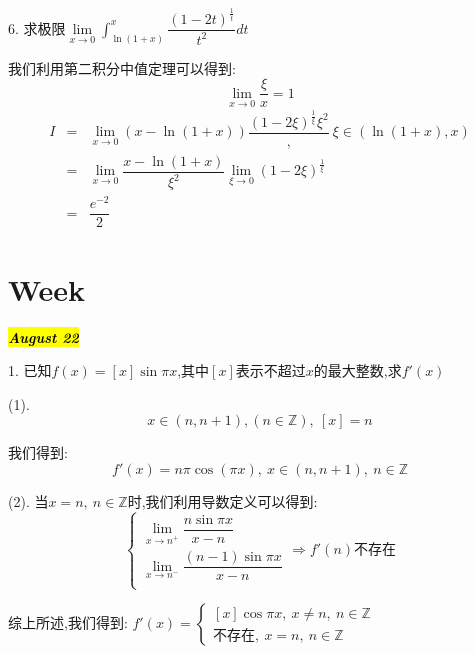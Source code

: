 6. 求极限$\lim\limits_{x\rightarrow 0}\int_{\ln(1+x)}^{x}\dfrac{(1-2t)^{\frac{1}{t}}}{t^2}dt$
\begin{solution}

	我们利用第二积分中值定理可以得到:  
	$$\lim\limits_{x\rightarrow 0}\dfrac{\xi}{x}=1$$
	\begin{eqnarray*}
		I&=&\lim\limits_{x\rightarrow 0}(x-\ln(1+x))\dfrac{(1-2\xi)^{\frac{1}{\xi}}{\xi^2}},\ \xi\in(\ln(1+x),x)\\
		 &=&\lim\limits_{x\rightarrow 0}\dfrac{x-\ln(1+x)}{\xi^2}\lim\limits_{\xi\rightarrow 0}(1-2\xi)^{\frac{1}{\xi}}\\
		 &=&\dfrac{e^{-2}}{2}
	\end{eqnarray*}
\end{solution}

\section{Week }
\hl{\textbf{\textit{August 22}}}

1. 已知$f(x)=[x]\sin \pi x$,其中$[x]$表示不超过$x$的最大整数,求$f'(x)$
\begin{solution}

	(1). 
	$$x\in(n,n+1),(n\in\mathbb{Z}),\ [x]=n$$
	
	我们得到:  $$f'(x)=n\pi\cos(\pi x),\ x\in(n,n+1), \ n\in\mathbb{Z}$$
	
	(2). 当$x=n,\ n\in\mathbb{Z}$时,我们利用导数定义可以得到:  
	$$\left\lbrace
	\begin{array}{l}
		\lim\limits_{x\rightarrow n^{+}}\dfrac{n\sin \pi x}{x-n}\\
		\lim\limits_{x\rightarrow n^{-}}\dfrac{(n-1)\sin \pi x}{x-n}\\
	\end{array}
	\right.\Rightarrow f'(n)\text{不存在}$$
	
	综上所述,我们得到:  $f'(x)=\left\lbrace
	\begin{array}{l}
		[x]\cos \pi x,\ x\neq n,\ n\in\mathbb{Z}\\
		\text{不存在},\ x=n,\ n\in\mathbb{Z}
	\end{array}
	\right. $
\end{solution}

